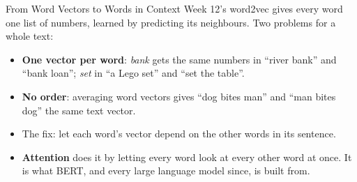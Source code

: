 \documentclass[aspectratio=169,11pt,xcolor=dvipsnames]{beamer}
\begin{document}
\begin{frame}{From Word Vectors to Words in Context}
Week 12's word2vec gives every word one list of numbers, learned by predicting its neighbours.
Two problems for a whole text:
\begin{itemize}\itemsep4pt
  \item \textbf{One vector per word}: \emph{bank} gets the same numbers in ``river bank'' and
        ``bank loan''; \emph{set} in ``a Lego set'' and ``set the table''.
  \item \textbf{No order}: averaging word vectors gives ``dog bites man'' and ``man bites dog''
        the same text vector.
\end{itemize}
\vskip4pt
\begin{itemize}\itemsep4pt
  \item The fix: let each word's vector depend on the other words in its sentence.
  \item \textbf{Attention} does it by letting every word look at every other word at once.
        It is what BERT, and every large language model since, is built from.
\end{itemize}
\end{frame}
\end{document}

